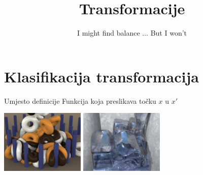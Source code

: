 \documentclass[9pt]{beamer}
\title{Transformacije}
\subtitle{ I might find balance $\ldots$ But I won't}
\institute{Računalna grafika}
\begin{document}
\begin{frame}
 \titlepage
\end{frame}

\section{Klasifikacija transformacija}

\begin{frame}{Umjesto definicije}
	Funkcija koja preslikava točku $x$ u $x'$
	\begin{center}
		\includegraphics[height=3cm]{slike/tori.png}
		\includegraphics[height=3cm]{slike/ice_stacked.png}
	\end{center}
\end{frame}
\end{document}
